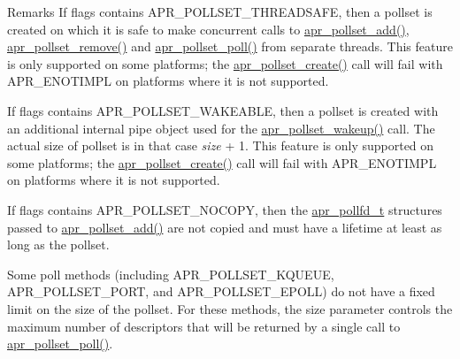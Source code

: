 \begin{DoxyRemark}{Remarks}
If flags contains A\+P\+R\+\_\+\+P\+O\+L\+L\+S\+E\+T\+\_\+\+T\+H\+R\+E\+A\+D\+S\+A\+FE, then a pollset is created on which it is safe to make concurrent calls to \hyperlink{group__apr__poll_ga4ec50bf9a11c6b60927c51b81412f5b9}{apr\+\_\+pollset\+\_\+add()}, \hyperlink{group__apr__poll_ga3c99c06e142d6b6b789eeb6086122e3a}{apr\+\_\+pollset\+\_\+remove()} and \hyperlink{group__apr__poll_ga6b31d7b3a7b2d356370403dd2b79ecf3}{apr\+\_\+pollset\+\_\+poll()} from separate threads. This feature is only supported on some platforms; the \hyperlink{group__apr__poll_ga4ca4056a19daee8fe94ddba100fe2326}{apr\+\_\+pollset\+\_\+create()} call will fail with A\+P\+R\+\_\+\+E\+N\+O\+T\+I\+M\+PL on platforms where it is not supported. 

If flags contains A\+P\+R\+\_\+\+P\+O\+L\+L\+S\+E\+T\+\_\+\+W\+A\+K\+E\+A\+B\+LE, then a pollset is created with an additional internal pipe object used for the \hyperlink{group__apr__poll_gac5e86828143e169e18b2a6eab94be531}{apr\+\_\+pollset\+\_\+wakeup()} call. The actual size of pollset is in that case {\itshape size} + 1. This feature is only supported on some platforms; the \hyperlink{group__apr__poll_ga4ca4056a19daee8fe94ddba100fe2326}{apr\+\_\+pollset\+\_\+create()} call will fail with A\+P\+R\+\_\+\+E\+N\+O\+T\+I\+M\+PL on platforms where it is not supported. 

If flags contains A\+P\+R\+\_\+\+P\+O\+L\+L\+S\+E\+T\+\_\+\+N\+O\+C\+O\+PY, then the \hyperlink{structapr__pollfd__t}{apr\+\_\+pollfd\+\_\+t} structures passed to \hyperlink{group__apr__poll_ga4ec50bf9a11c6b60927c51b81412f5b9}{apr\+\_\+pollset\+\_\+add()} are not copied and must have a lifetime at least as long as the pollset. 

Some poll methods (including A\+P\+R\+\_\+\+P\+O\+L\+L\+S\+E\+T\+\_\+\+K\+Q\+U\+E\+UE, A\+P\+R\+\_\+\+P\+O\+L\+L\+S\+E\+T\+\_\+\+P\+O\+RT, and A\+P\+R\+\_\+\+P\+O\+L\+L\+S\+E\+T\+\_\+\+E\+P\+O\+LL) do not have a fixed limit on the size of the pollset. For these methods, the size parameter controls the maximum number of descriptors that will be returned by a single call to \hyperlink{group__apr__poll_ga6b31d7b3a7b2d356370403dd2b79ecf3}{apr\+\_\+pollset\+\_\+poll()}. 
\end{DoxyRemark}
